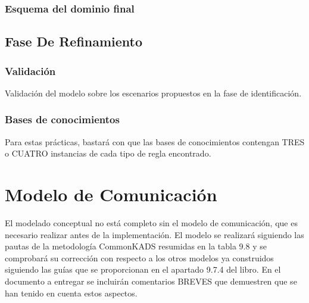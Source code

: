 \documentclass[12pt,a4paper,twoside,spanish]{article}      %
\begin{document}
\subsubsection{Esquema del dominio final}



\subsection{Fase De Refinamiento}


\subsubsection{Validación}

Validación del modelo sobre los escenarios propuestos en la fase
de identificación.

\subsubsection{Bases de conocimientos}

Para estas prácticas, bastará con que las bases
de conocimientos contengan TRES o CUATRO instancias de cada tipo de
regla encontrado.

\section{Modelo de Comunicación}

El modelado conceptual no está completo sin el modelo de
comunicación, que es necesario realizar antes de la implementación. El
modelo se realizará siguiendo las pautas de la metodología CommonKADS
resumidas en la tabla 9.8 y se comprobará su corrección con respecto a los
otros modelos ya construidos siguiendo las guías que se proporcionan en el
apartado 9.7.4 del libro. En el documento a entregar se incluirán
comentarios BREVES que demuestren que se han tenido en cuenta estos
aspectos.
\end{document}
